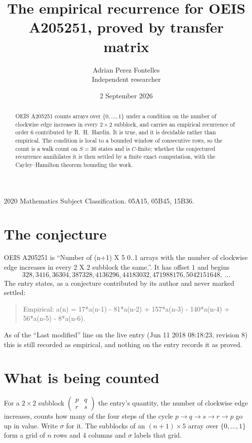 \documentclass[11pt,a4paper]{article}
\title{The empirical recurrence for OEIS A205251, proved by transfer matrix}
\author{Adrian Perez Fontelles\\ \small Independent researcher}
\date{2 September 2026}
\theoremstyle{plain}
\theoremstyle{definition}
\begin{document}
\maketitle

\begin{abstract}
OEIS A205251 counts arrays over $\{0,\dots,1\}$ under a condition on the number of clockwise edge increases
in every $2\times2$ subblock, and carries an empirical recurrence of order $6$ contributed by
R.~H.~Hardin. It is true, and it is decidable rather than empirical. The condition is local to
a bounded window of consecutive rows, so the count is a walk count on $S=36$ states and is
$C$-finite; whether the conjectured recurrence annihilates it is then settled by a finite exact
computation, with the Cayley--Hamilton theorem bounding the work.
\end{abstract}

\noindent\small 2020 Mathematics Subject Classification. 05A15, 05B45, 15B36.\normalsize

\section{The conjecture}

OEIS A205251 is ``Number of (n+1) X 5 0..1 arrays with the number of clockwise edge increases in every 2 X 2 subblock the same.''. It has offset $1$ and begins
\[
328, 3416, 36304, 387328, 4136296, 44183032, 471988176, 5042151648,\ \dots
\]
The entry states, as a conjecture contributed by its author and never marked settled:
\begin{quote}
Empirical: a(n) = 17*a(n-1) - 81*a(n-2) + 157*a(n-3) - 140*a(n-4) + 56*a(n-5) - 8*a(n-6).
\end{quote}
As of the ``Last modified'' line on the live entry (Jun 11 2018 08:18:23, revision 8) this is still
recorded as empirical, and nothing on the entry records it as proved.

\section{What is being counted}

For a $2\times2$ subblock $\begin{pmatrix}p&q\\r&s\end{pmatrix}$ the
entry's quantity, the number of clockwise edge increases, counts how many of the four steps of the cycle $p\to q\to s\to r\to p$ go up in value. Write $\sigma$ for it. The subblocks of an
$(n+1)\times5$ array over $\{0,\dots,1\}$ form a grid of $n$ rows and $4$
columns and $\sigma$ labels that grid.
\end{document}
